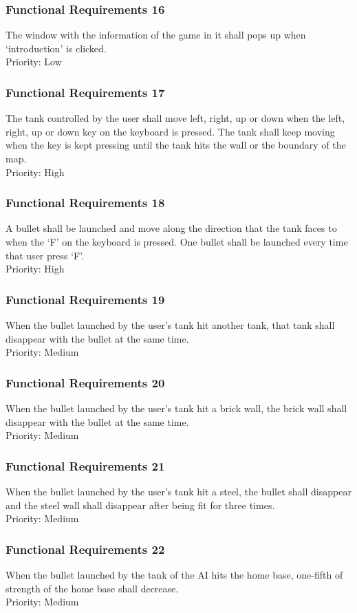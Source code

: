 \documentclass[12pt, titlepage]{article}
\begin{document}
\subsubsection{Functional Requirements 16} The window with the information of the game in it shall pops up when 
`introduction' is clicked.\\Priority: Low
\subsubsection{Functional Requirements 17} The tank controlled by the user shall move left, right, up or down when 
the left, right, up or down key on the keyboard is pressed. The tank shall keep
 moving when the key is kept pressing until the tank hits the wall or the 
 boundary of the map.\\Priority: High
\subsubsection{Functional Requirements 18} A bullet shall be launched and move along the direction that the tank
 faces to when the `F' on the keyboard is pressed. One bullet shall be launched 
 every time that user press `F'.\\Priority: High
\subsubsection{Functional Requirements 19} When the bullet launched by the user's tank hit another tank, that tank 
shall disappear with the bullet at the same time.\\Priority: Medium
\subsubsection{Functional Requirements 20} When the bullet launched by the user's tank hit a brick wall, the brick 
wall shall disappear with the bullet at the same time.\\Priority: Medium
\subsubsection{Functional Requirements 21} When the bullet launched by the user's tank hit a steel, the bullet shall 
disappear and the steel wall shall disappear after being fit for three times.\\Priority: Medium
\subsubsection{Functional Requirements 22} When the bullet launched by the tank of the AI hits the  home base, 
one-fifth of strength of the home base shall decrease.\\Priority: Medium
\end{document}
